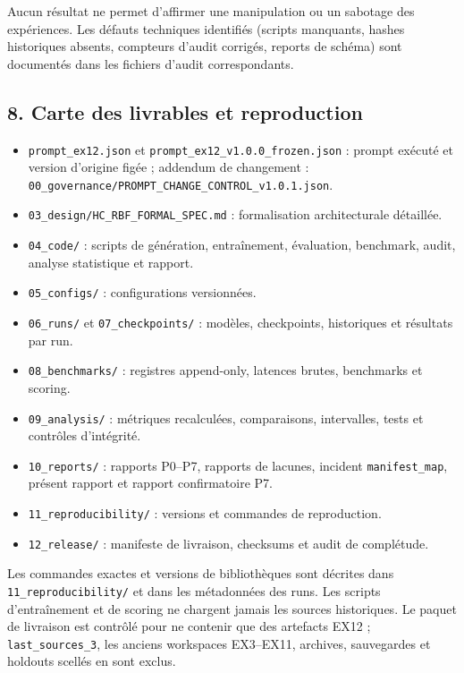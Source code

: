 \documentclass[
]{article}
\providecommand{\tightlist}{%
  \setlength{\itemsep}{0pt}\setlength{\parskip}{0pt}}
\begin{document}
Aucun résultat ne permet d'affirmer une manipulation ou un sabotage des
expériences. Les défauts techniques identifiés (scripts manquants,
hashes historiques absents, compteurs d'audit corrigés, reports de
schéma) sont documentés dans les fichiers d'audit correspondants.

\subsection{8. Carte des livrables et
reproduction}\label{carte-des-livrables-et-reproduction}

\begin{itemize}
\tightlist
\item
  \texttt{prompt\_ex12.json} et
  \texttt{prompt\_ex12\_v1.0.0\_frozen.json} : prompt exécuté et version
  d'origine figée ; addendum de changement :
  \texttt{00\_governance/PROMPT\_CHANGE\_CONTROL\_v1.0.1.json}.
\item
  \texttt{03\_design/HC\_RBF\_FORMAL\_SPEC.md} : formalisation
  architecturale détaillée.
\item
  \texttt{04\_code/} : scripts de génération, entraînement, évaluation,
  benchmark, audit, analyse statistique et rapport.
\item
  \texttt{05\_configs/} : configurations versionnées.
\item
  \texttt{06\_runs/} et \texttt{07\_checkpoints/} : modèles,
  checkpoints, historiques et résultats par run.
\item
  \texttt{08\_benchmarks/} : registres append-only, latences brutes,
  benchmarks et scoring.
\item
  \texttt{09\_analysis/} : métriques recalculées, comparaisons,
  intervalles, tests et contrôles d'intégrité.
\item
  \texttt{10\_reports/} : rapports P0--P7, rapports de lacunes, incident
  \texttt{manifest\_map}, présent rapport et rapport confirmatoire P7.
\item
  \texttt{11\_reproducibility/} : versions et commandes de reproduction.
\item
  \texttt{12\_release/} : manifeste de livraison, checksums et audit de
  complétude.
\end{itemize}

Les commandes exactes et versions de bibliothèques sont décrites dans
\texttt{11\_reproducibility/} et dans les métadonnées des runs. Les
scripts d'entraînement et de scoring ne chargent jamais les sources
historiques. Le paquet de livraison est contrôlé pour ne contenir que
des artefacts EX12 ; \texttt{last\_sources\_3}, les anciens workspaces
EX3--EX11, archives, sauvegardes et holdouts scellés en sont exclus.
\end{document}
